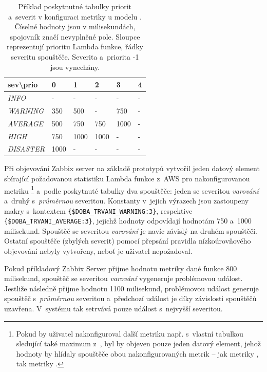 \documentclass[czech, ing, kiv, he, iso690]{fasthesis}
\begin{document}
\begin{table}[]
\centering
\begin{tabular}{|l|l|l|l|l|l|}
\hline
sev\textbackslash prio          & \textbf{0} & \textbf{1} & \textbf{2} & \textbf{3} & \textbf{4} \\ \hline
\textit{INFO}     & -          & -          & -          & -          & -          \\ \hline
\textit{WARNING}  & 350        & 500        & -          & 750        & -          \\ \hline
\textit{AVERAGE}  & 500        & 750        & 750        & 1000       & -          \\ \hline
\textit{HIGH}     & 750        & 1000       & 1000       & -          & -          \\ \hline
\textit{DISASTER} & 1000       & -          & -          & -          & -          \\ \hline
\end{tabular}
\caption{Příklad poskytnutné tabulky priorit a~severit v konfiguraci metriky  u modelu . Číselné hodnoty jsou v milisekundách, spojovník značí nevyplněné pole. Sloupce reprezentují prioritu Lambda funkce, řádky severitu spouštěče. Severita  a~priorita -1 jsou vynechány.}
\label{tab:multi-trig-prio_tab-example}
\end{table}

Při objevování Zabbix server na základě prototypů vytvořil jeden datový element sbírající požadovanou statistiku Lambda funkce  z~AWS pro nakonfigurovanou metriku \footnote{Pokud by uživatel nakonfiguroval další metriku např.  s~vlastní tabulkou sledující také maximum z~, byl by objeven pouze jeden datový element, jehož hodnoty by hlídaly spouštěče obou nakonfigurovaných metrik -- jak metriky , tak metriky .} a~podle poskytnuté tabulky dva spouštěče: jeden se severitou \emph{varování} a~druhý s~\emph{průměrnou} severitou. Konstanty v~jejich výrazech jsou zastoupeny makry s~kontextem \verb|{$DOBA_TRVANI_WARNING:3}|, respektive \verb|{$DOBA_TRVANI_AVERAGE:3}|, jejichž hodnoty odpovídají hodnotám 750 a~1000 milisekund. Spouštěč se severitou \emph{varování} je navíc závislý na druhém spouštěči. Ostatní spouštěče (zbylých severit) pomocí přepsání pravidla nízkoúrovňového objevování nebyly vytvořeny, neboť je uživatel nepožadoval.

Pokud příkladový Zabbix Server přijme hodnotu metriky  dané funkce 800 milisekund, spouštěč se severitou \emph{varování} vygeneruje problémovou událost. Jestliže následně přijme hodnotu 1100 milisekund, problémovou událost generuje spouštěč s~\emph{průměrnou} severitou a~předchozí událost je díky závislosti spouštěčů uzavřena. V~systému tak setrvává pouze událost s~nejvyšší severitou.
\end{document}
